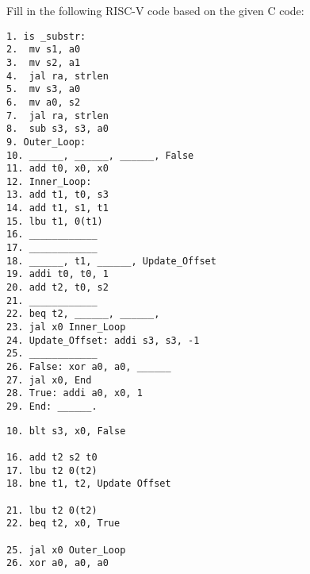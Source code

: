 \begin{blocksection}
\question
Fill in the following RISC-V code based on the given C code:

\begin{verbatim}
1. is _substr:
2. 	mv s1, a0
3. 	mv s2, a1
4. 	jal ra, strlen
5. 	mv s3, a0
6. 	mv a0, s2
7. 	jal ra, strlen
8. 	sub s3, s3, a0
9. Outer_Loop:
10. ______, ______, ______, False
11. add t0, x0, x0
12. Inner_Loop:
13. add t1, t0, s3
14. add t1, s1, t1
15. lbu t1, 0(t1)
16. ____________
17. ____________
18. ______, t1, ______, Update_Offset
19. addi t0, t0, 1
20. add t2, t0, s2
21. ____________
22. beq t2, ______, ______,
23. jal x0 Inner_Loop
24. Update_Offset: addi s3, s3, -1
25. ____________
26. False: xor a0, a0, ______
27. jal x0, End
28. True: addi a0, x0, 1
29. End: ______.
\end{verbatim}

\begin{solution}
\begin{verbatim}
10. blt s3, x0, False

16. add t2 s2 t0
17. lbu t2 0(t2)
18. bne t1, t2, Update Offset

21. lbu t2 0(t2)
22. beq t2, x0, True

25. jal x0 Outer_Loop
26. xor a0, a0, a0
\end{verbatim}
\end{solution}

\end{blocksection}